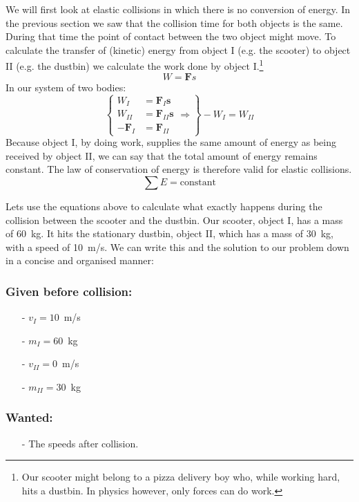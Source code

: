 \documentclass[12pt,a4paper]{article}
\numberwithin{equation}{section}
\numberwithin{figure}{section}
\numberwithin{table}{section}
\begin{document}
We will first look at elastic collisions in which there is no conversion of energy. In the previous section we saw that the collision time for both objects is the same. During that time the point of contact between the two object might move. To calculate the transfer of (kinetic) energy from object I (e.g. the scooter) to object II (e.g. the dustbin) we calculate the work done by object I.\footnote{Our scooter might belong to a pizza delivery boy who, while working hard, hits a dustbin. In physics however, only forces can do work.}
\begin{equation}
W=\textbf{F}s
\end{equation}
In our system of two bodies:
\begin{equation}
\left\lbrace  \begin{array}{rl}
W_I &= \textbf{F}_I \textbf{s} \\
W_{II} &= \textbf{F}_{II} \textbf{s} \\
-\textbf{F}_I &= \textbf{F}_{II} \end{array} \Rightarrow \right\rbrace -W_I = W_{II}
\end{equation}
Because object I, by doing work, supplies the same amount of energy as being received by object II, we can say that the total amount of energy remains constant. The law of conservation of energy is therefore valid for elastic collisions.
\begin{equation}
\sum E =\mbox{constant}
\end{equation}

Lets use the equations above to calculate what exactly happens during the collision between the scooter and the dustbin. Our scooter, object I, has a mass of 60~kg. It hits the stationary dustbin, object II, which has a mass of 30~kg, with a speed of 10~m/s. We can write this and the solution to our problem down in a concise and organised manner:

\subsubsection*{Given before collision:}
\begin{itemize}
\item[-] $v_I = 10$~m/s
\item[-] $m_I = 60$~kg
\item[-] $v_{II} = 0$~m/s
\item[-] $m_{II} = 30$~kg
\end{itemize}

\subsubsection*{Wanted:}
\begin{itemize}
\item[-] The speeds after collision.
\end{itemize}
\end{document}
